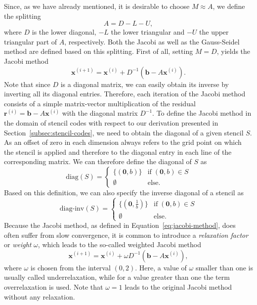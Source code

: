 Since, as we have already mentioned, it is desirable to choose $M \approx A$, we define the splitting
\begin{equation}
	A = D - L - U,
\end{equation} 
where $D$ is the lower diagonal, $-L$ the lower triangular and $-U$ the upper triangular part of $A$, respectively.
Both the Jacobi as well as the Gauss-Seidel method are defined based on this splitting.
First of all, setting $M = D$, yields the Jacobi method
\begin{equation}
	\bm{x}^{(i+1)} = \bm{x}^{(i)} + D^{-1}(\bm b - A \bm{x}^{(i)}).
	\label{eq:jacobi-method}
\end{equation}
Note that since $D$ is a diagonal matrix, we can easily obtain its inverse by inverting all its diagonal entries.
Therefore, each iteration of the Jacobi method consists of a simple matrix-vector multiplication of the residual $\bm{r}^{(i)} = \bm{b} - A \bm{x}^{(i)}$ with the diagonal matrix $D^{-1}$.
To define the Jacobi method in the domain of stencil codes with respect to our derivation presented in Section~\ref{subsec:stencil-codes}, we need to obtain the diagonal of a given stencil $S$.
As an offset of zero in each dimension always refers to the grid point on which the stencil is applied and therefore to the diagonal entry in each line of the corresponding matrix.
We can therefore define the diagonal of $S$ as
\begin{equation}
	\text{diag}(S) = \begin{cases}
		\{(\bm{0}, b) \} & \text{if} \; (\bm 0, b) \in S \\
		\emptyset & \text{else}.
	\end{cases}
	\label{eq:stencil-diag}
\end{equation}
Based on this definition, we can also specify the inverse diagonal of a stencil as
\begin{equation}
	\text{diag-inv}(S) = \begin{cases}
		\{(\bm{0}, \frac{1}{b}) \} & \text{if} \; (\bm 0, b) \in S \\
		\emptyset & \text{else}.
	\end{cases}
	\label{eq:stencil-diag-inv}
\end{equation}
Because the Jacobi method, as defined in Equation~\eqref{eq:jacobi-method}, does often suffer from slow convergence, it is common to introduce a \emph{relaxation factor} or \emph{weight} $\omega$, which leads to the so-called weighted Jacobi method
\begin{equation}
	\bm{x}^{(i+1)} = \bm{x}^{(i)} + \omega D^{-1}(\bm b - A \bm{x}^{(i)}),
	\label{eq:weighted-jacobi-method}
\end{equation}
where $\omega$ is chosen from the interval $\left(0, 2\right)$.
Here, a value of $\omega$ smaller than one is usually called underrelaxation, while for a value greater than one the term overrelaxation is used.
Note that $\omega = 1$ leads to the original Jacobi method without any relaxation.

